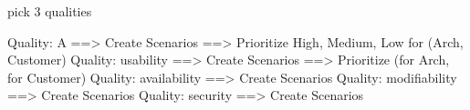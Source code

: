 pick 3 qualities

Quality: A ==> Create Scenarios ==> Prioritize High, Medium, Low for (Arch, Customer)
Quality: usability ==> Create Scenarios ==> Prioritize (for Arch, for Customer) 
Quality: availability ==> Create Scenarios 
Quality: modifiability ==> Create Scenarios
Quality: security ==> Create Scenarios


















